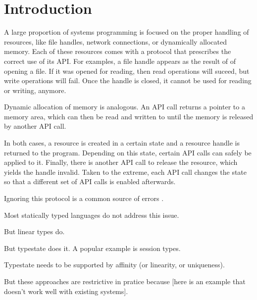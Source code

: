 \section{Introduction}

A large proportion of systems programming is focused on the proper
handling of resources, like file handles, network connections, or
dynamically allocated memory. Each of these resources comes with a
protocol that prescribes the correct use of its API.
For examples, a file handle appears as the result of of opening a
file. If it was opened for reading, then read operations will suceed,
but write operations will fail. Once the handle is closed, it cannot
be used for reading or writing, anymore.

Dynamic allocation of memory is analogous. An API call returns a
pointer to a memory area, which can then be read and written to until
the memory is released by another API call.

In both cases, a resource is created in a certain state and a resource
handle is returned to the program. Depending on this state, certain API calls
can safely be applied to it. Finally, there is another API call to
release the resource, which yields the handle invalid.
Taken to the extreme, each API call changes the state so that a
different set of API calls is enabled afterwards. 

Ignoring this protocol is a common source of errors \cite{is there
  some paper?}.

Most statically typed languages do not address this issue.

But linear types do.

But typestate does it. A popular example is session types.

Typestate needs to be supported by affinity (or linearity, or
uniqueness).

But these approaches are restrictive in pratice because [here is an
example that doesn't work well with existing systems].

